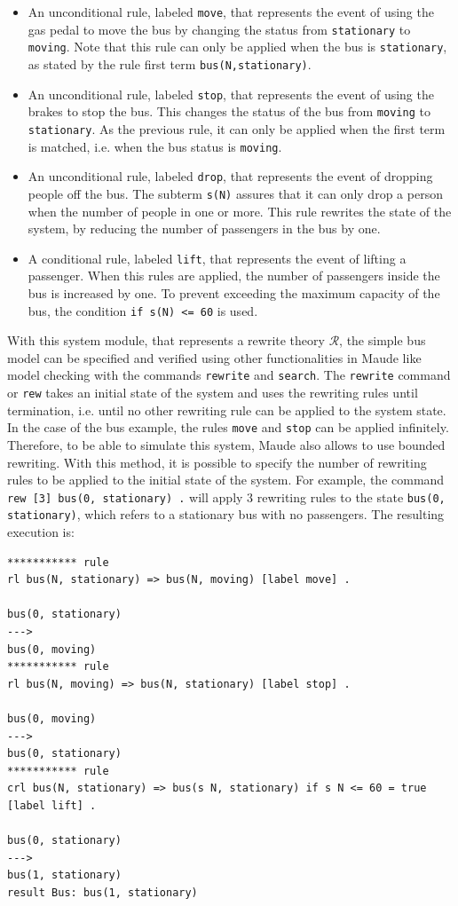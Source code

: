 \begin{itemize}
    \item An unconditional rule, labeled \texttt{move}, that represents the event of using the gas pedal to move the bus by changing the status from \texttt{stationary} to \texttt{moving}. Note that this rule can only be applied when the bus is \texttt{stationary}, as stated by the rule first term \texttt{bus(N,stationary)}.
    \item An unconditional rule, labeled \texttt{stop}, that represents the event of using the brakes to stop the bus. This changes the status of the bus from \texttt{moving} to \texttt{stationary}. As the previous rule, it can only be applied when the first term is matched, i.e. when the bus status is \texttt{moving}. 
    \item An unconditional rule, labeled \texttt{drop}, that represents the event of dropping people off the bus. The subterm \texttt{s(N)} assures that it can only drop a person when the number of people in one or more. This rule rewrites the state of the system, by reducing the number of passengers in the bus by one.
    \item A conditional rule, labeled \texttt{lift}, that represents the event of lifting a passenger. When this rules are applied, the number of passengers inside the bus is increased by one. To prevent exceeding the maximum capacity of the bus, the condition \texttt{if s(N) <= 60} is used. 
\end{itemize}
With this system module, that represents a rewrite theory $\mathscr{R}$, the simple bus model can be specified and verified using other functionalities in Maude like model checking with the commands \texttt{rewrite} and \texttt{search}. The \texttt{rewrite} command or \texttt{rew} takes an initial state of the system and uses the rewriting rules until termination, i.e. until no other rewriting rule can be applied to the system state. In the case of the bus example, the rules \texttt{move} and \texttt{stop} can be applied infinitely. Therefore, to be able to simulate this system, Maude also allows to use bounded rewriting. With this method, it is possible to specify the number of rewriting rules to be applied to the initial state of the system. For example, the command \texttt{rew [3] bus(0, stationary) .} will apply 3 rewriting rules to the state \texttt{bus(0, stationary)}, which refers to a stationary bus with no passengers. The resulting execution is:
\begin{lstlisting}
*********** rule
rl bus(N, stationary) => bus(N, moving) [label move] .

bus(0, stationary)
--->
bus(0, moving)
*********** rule
rl bus(N, moving) => bus(N, stationary) [label stop] .

bus(0, moving)
--->
bus(0, stationary)
*********** rule
crl bus(N, stationary) => bus(s N, stationary) if s N <= 60 = true [label lift] .

bus(0, stationary)
--->
bus(1, stationary)
result Bus: bus(1, stationary)
\end{lstlisting}
